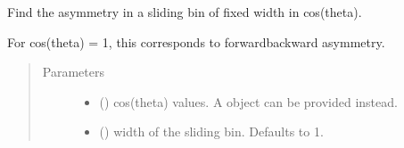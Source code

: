 \documentclass[letterpaper,10pt,english]{sphinxmanual}
\begin{document}
\begin{fulllineitems}
\label{\detokenize{analysis:scdc.analyze.plane_asymmetry}}
Find the asymmetry in a sliding bin of fixed width in cos(theta).

For cos(theta) = 1, this corresponds to forward\sphinxhyphen{}backward asymmetry.
\begin{quote}\begin{description}
\item[{Parameters}] \leavevmode\begin{itemize}
\item {} 
 () \textendash{} cos(theta) values. A 
object can be provided instead.

\item {} 
 (\sphinxstyleliteralemphasis{\sphinxupquote{, }}) \textendash{} width of the sliding bin. Defaults to 1.

\end{itemize}

\end{description}\end{quote}

\end{fulllineitems}

\end{document}
